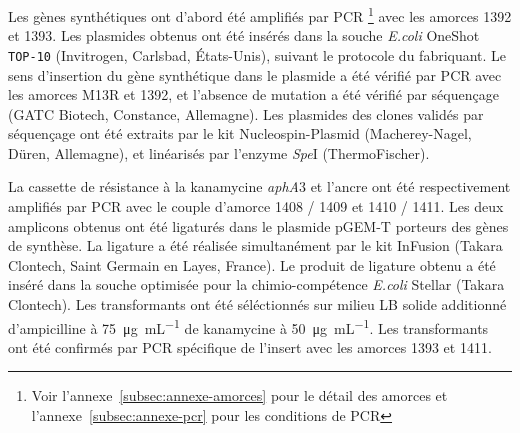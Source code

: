Les gènes synthétiques ont d'abord été amplifiés par PCR \footnote{Voir
  l'annexe~\ref{subsec:annexe-amorces} pour le détail des amorces et
  l'annexe~\ref{subsec:annexe-pcr} pour les conditions de PCR} avec les amorces
1392 et 1393. Les plasmides obtenus ont été insérés dans la souche \emph{E.coli}
OneShot\textsuperscript{{\textregistered}} \texttt{TOP-10} (Invitrogen,
Carlsbad, États-Unis), suivant le protocole du fabriquant. Le sens d'insertion
du gène synthétique dans le plasmide a été vérifié par PCR avec les amorces M13R
et 1392, et l'absence de mutation a été vérifié par séquençage (GATC Biotech,
Constance, Allemagne). Les plasmides des clones validés par séquençage ont été
extraits par le kit Nucleospin-Plasmid (Macherey-Nagel, Düren, Allemagne), et
linéarisés par l'enzyme \emph{Spe}I (ThermoFischer).

La cassette de résistance à la kanamycine \emph{aphA}3 et l'ancre ont été
respectivement amplifiés par PCR avec le couple d'amorce 1408 / 1409 et 1410 /
1411. Les deux amplicons obtenus ont été ligaturés dans le plasmide pGEM-T
porteurs des gènes de synthèse. La ligature a été réalisée simultanément par le
kit InFusion (Takara Clontech, Saint Germain en Layes, France). Le produit de
ligature obtenu a été inséré dans la souche optimisée pour la chimio-compétence
\emph{E.coli} Stellar (Takara Clontech). Les transformants ont été séléctionnés
sur milieu LB solide additionné d'ampicilline à \SI{75}{\ug\per\mL} de
kanamycine à \SI{50}{\ug\per\mL}. Les transformants ont été confirmés par PCR
spécifique de l'insert avec les amorces 1393 et 1411.


